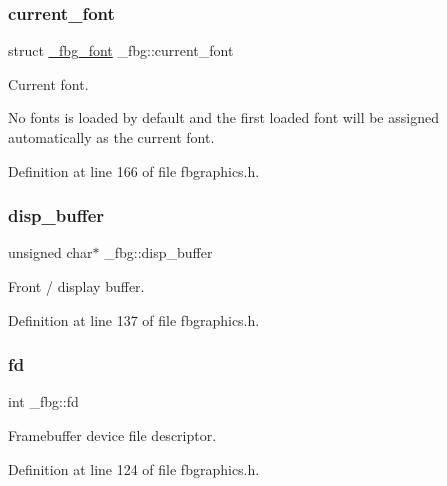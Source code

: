 \mbox{\label{struct__fbg_a72868d703236aaabb7a5031703a6bbd8}} 
\subsubsection{\texorpdfstring{current\+\_\+font}{current\_font}}
{\footnotesize\ttfamily struct \mbox{\hyperlink{fbgraphics_8h_struct__fbg__font}{\+\_\+fbg\+\_\+font}} \+\_\+fbg\+::current\+\_\+font}



Current font. 

No fonts is loaded by default and the first loaded font will be assigned automatically as the current font. 

Definition at line 166 of file fbgraphics.\+h.

\mbox{\label{struct__fbg_aa20614c94c7235bc5bc105b6e71e1be8}} 
\subsubsection{\texorpdfstring{disp\+\_\+buffer}{disp\_buffer}}
{\footnotesize\ttfamily unsigned char$\ast$ \+\_\+fbg\+::disp\+\_\+buffer}



Front / display buffer. 



Definition at line 137 of file fbgraphics.\+h.

\mbox{\label{struct__fbg_acfa58132f44f89e832ae7f73f5583b7e}} 
\subsubsection{\texorpdfstring{fd}{fd}}
{\footnotesize\ttfamily int \+\_\+fbg\+::fd}



Framebuffer device file descriptor. 



Definition at line 124 of file fbgraphics.\+h.

\mbox{\label{struct__fbg_ad3cac82bd9448a4020a4e08621f5269a}} 

